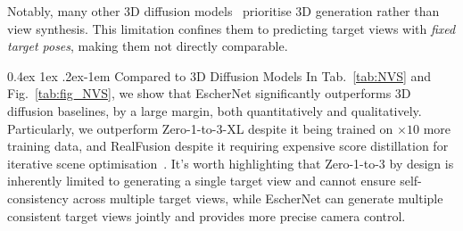 \documentclass[10pt,twocolumn,letterpaper]{article}
\makeatletter
\renewcommand{\paragraph}{%
  \@startsection{paragraph}{4}%
  {\z@}{0.4ex \@plus 1ex \@minus .2ex}{-1em}%
  {\normalfont\normalsize\bfseries}%
}
\makeatother
\begin{document}
Notably, many other 3D diffusion models~\cite{liu2023syncdreamer,long2023wonder3d,shi2023zero123++,ye2023consistent123,liu2023one} prioritise 3D generation rather than view synthesis. This limitation confines them to predicting target views with {\it fixed target poses}, making them not directly comparable.

\paragraph{Compared to 3D Diffusion Models} 
In Tab.~\ref{tab:NVS} and Fig.~\ref{tab:fig_NVS}, we show that EscherNet significantly outperforms 3D diffusion baselines, by a large margin, both quantitatively and qualitatively. Particularly, we outperform Zero-1-to-3-XL despite it being trained on $\times 10$ more training data, and RealFusion despite it requiring expensive score distillation for iterative scene optimisation~\cite{poole2022dreamfusion}. It's worth highlighting that Zero-1-to-3 by design is inherently limited to generating a single target view and cannot ensure self-consistency across multiple target views, while EscherNet can generate multiple consistent target views jointly and provides more precise camera control. 
\end{document}
